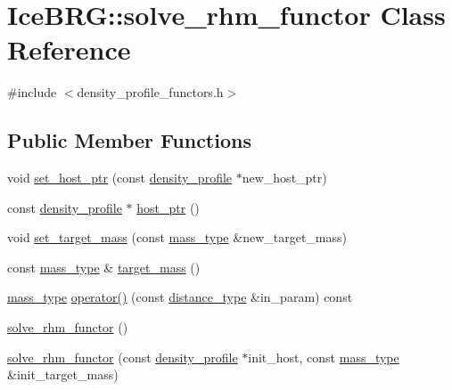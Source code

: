 \hypertarget{classIceBRG_1_1solve__rhm__functor}{}\section{Ice\+B\+R\+G\+:\+:solve\+\_\+rhm\+\_\+functor Class Reference}
\label{classIceBRG_1_1solve__rhm__functor}


{\ttfamily \#include $<$density\+\_\+profile\+\_\+functors.\+h$>$}

\subsection*{Public Member Functions}
\begin{DoxyCompactItemize}
\item 
void \hyperlink{classIceBRG_1_1solve__rhm__functor_abd3409541143f784364f81da75fa031c}{set\+\_\+host\+\_\+ptr} (const \hyperlink{classIceBRG_1_1density__profile}{density\+\_\+profile} $\ast$new\+\_\+host\+\_\+ptr)
\item 
const \hyperlink{classIceBRG_1_1density__profile}{density\+\_\+profile} $\ast$ \hyperlink{classIceBRG_1_1solve__rhm__functor_adb491be13e13b4fcd56d951651d3fa9e}{host\+\_\+ptr} ()
\item 
void \hyperlink{classIceBRG_1_1solve__rhm__functor_a978ba7c3a90bf01579e5a75e174e6ba6}{set\+\_\+target\+\_\+mass} (const \hyperlink{namespaceIceBRG_a1be72ac4918a9b029f2eefa084213e35}{mass\+\_\+type} \&new\+\_\+target\+\_\+mass)
\item 
const \hyperlink{namespaceIceBRG_a1be72ac4918a9b029f2eefa084213e35}{mass\+\_\+type} \& \hyperlink{classIceBRG_1_1solve__rhm__functor_a395d630e25cf7cb05bcc6ac1ccafd8ef}{target\+\_\+mass} ()
\item 
\hyperlink{namespaceIceBRG_a1be72ac4918a9b029f2eefa084213e35}{mass\+\_\+type} \hyperlink{classIceBRG_1_1solve__rhm__functor_aebbe2dcb89bc2e00c894cfc023908fad}{operator()} (const \hyperlink{namespaceIceBRG_a45499647eb87e24c10ab32c628711cec}{distance\+\_\+type} \&in\+\_\+param) const 
\item 
\hyperlink{classIceBRG_1_1solve__rhm__functor_a457c7cf1c24146592d91d2004c011060}{solve\+\_\+rhm\+\_\+functor} ()
\item 
\hyperlink{classIceBRG_1_1solve__rhm__functor_aae0ce0636530e6de3eb01205e03d527a}{solve\+\_\+rhm\+\_\+functor} (const \hyperlink{classIceBRG_1_1density__profile}{density\+\_\+profile} $\ast$init\+\_\+host, const \hyperlink{namespaceIceBRG_a1be72ac4918a9b029f2eefa084213e35}{mass\+\_\+type} \&init\+\_\+target\+\_\+mass)
\end{DoxyCompactItemize}


